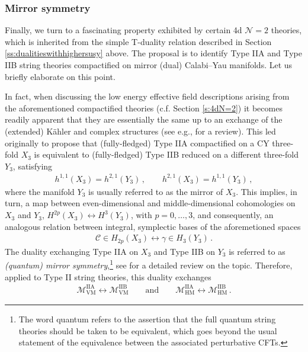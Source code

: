 \subsubsection*{Mirror symmetry}

Finally, we turn to a fascinating property exhibited by certain 4d $\mathcal{N}=2$ theories, which is inherited from the simple T-duality relation described in Section \ref{ss:dualitieswithhighersusy} above. The proposal is to identify Type IIA and Type IIB string theories compactified on mirror (dual) Calabi--Yau manifolds. Let us briefly elaborate on this point. 

In fact, when discussing the low energy effective field descriptions arising from the aforementioned compactified theories (c.f. Section \ref{s:4dN=2}) it becomes readily apparent that they are essentially the same up to an exchange of the (extended) K\"ahler and complex structures (see e.g., \cite{Grimm:2005fa} for a review). This led originally \cite{Candelas:1989hd, Greene:1989cf,Greene:1990ud,Aspinwall:1990xe,Candelas:1990rm,Aspinwall_1994,kontsevich1994homological} to propose that (fully-fledged) Type IIA compactified on a CY three-fold $X_3$ is equivalent to (fully-fledged) Type IIB reduced on a different three-fold $Y_3$, satisfying 
%
\begin{align}
 h^{1,1}(X_3) = h^{2,1}(Y_3)\, ,\qquad h^{2,1} (X_3) = h^{1,1}(Y_3)\, ,
\end{align}
%
where the manifold $Y_3$ is usually referred to as the mirror of $X_3$. This implies, in turn, a
map between even-dimensional and middle-dimensional cohomologies on $X_3$ and $Y_3$, $H^{2p}(X_3) \leftrightarrow H^3(Y_3)$, with $p=0, \ldots,3$, and consequently, an analogous relation between integral, symplectic bases of the aforemetioned spaces
%
\begin{align}
\mathcal{C} \in H_{2p}(X_3) \longleftrightarrow \gamma \in H_{3}(Y_3)\, . 
\end{align}
%
The duality exchanging Type IIA on $X_3$ and Type IIB on $Y_3$ is referred to as \textit{(quantum) mirror symmetry},\footnote{The word quantum refers to the assertion that the full quantum string theories should be taken to be equivalent, which goes beyond the usual statement of the equivalence between the associated perturbative CFTs.} see \cite{Hori:2003ic,Hosono:1994av} for a detailed review on the topic. Therefore, applied to Type II string theories, this duality exchanges
%
\begin{align}\label{eq:mapmirrorsymmetry}
\mathcal{M}_{\text{VM}}^\text{IIA} \longleftrightarrow \mathcal{M}_{\text{VM}}^\text{IIB} \qquad \text{and} \qquad \mathcal{M}_{\text{HM}}^\text{IIA} \longleftrightarrow \mathcal{M}_{\text{HM}}^\text{IIB}\, . 
\end{align}
